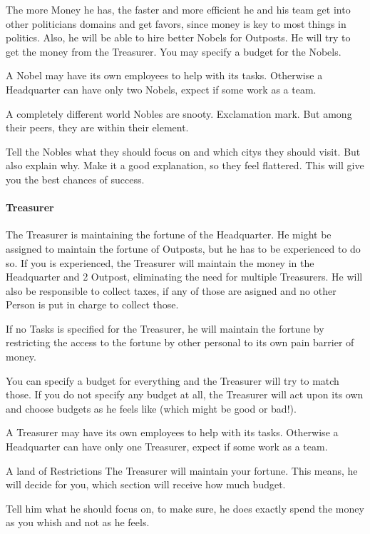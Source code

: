 \documentclass[10pt,twoside,twocolumn,openany]{book}
\begin{document}
The more Money he has, the faster and more efficient he and his team get into other politicians domains and get favors, since money is key to most things in politics. Also, he will be able to hire better Nobels for Outposts. He will try to get the money from the Treasurer. You may specify a budget for the Nobels.

A Nobel may have its own employees to help with its tasks. Otherwise a Headquarter can have only two Nobels, expect if some work as a team.

\begin{paperbox}{A completely different world}
Nobles are snooty. Exclamation mark. But among their peers, they are within their element. 

Tell the Nobles what they should focus on and which citys they should visit. But also explain why. Make it a good explanation, so they feel flattered. This will give you the best chances of success.
\end{paperbox}

\paragraph{Treasurer}

The Treasurer is maintaining the fortune of the Headquarter. He might be assigned to maintain the fortune of Outposts, but he has to be experienced to do so. If you is experienced, the Treasurer will maintain the money in the Headquarter and 2 Outpost, eliminating the need for multiple Treasurers. He will also be responsible to collect taxes, if any of those are asigned and no other Person is put in charge to collect those.

If no Tasks is specified for the Treasurer, he will maintain the fortune by restricting the access to the fortune by other personal to its own pain barrier of money.

You can specify a budget for everything and the Treasurer will try to match those. If you do not specify any budget at all, the Treasurer will act upon its own and choose budgets as he feels like (which might be good or bad!).

A Treasurer may have its own employees to help with its tasks. Otherwise a Headquarter can have only one Treasurer, expect if some work as a team.

\begin{paperbox}{A land of Restrictions}
The Treasurer will maintain your fortune. This means, he will decide for you, which section will receive how much budget. 

Tell him what he should focus on, to make sure, he does exactly spend the money as you whish and not as he feels.
\end{paperbox}
\end{document}

